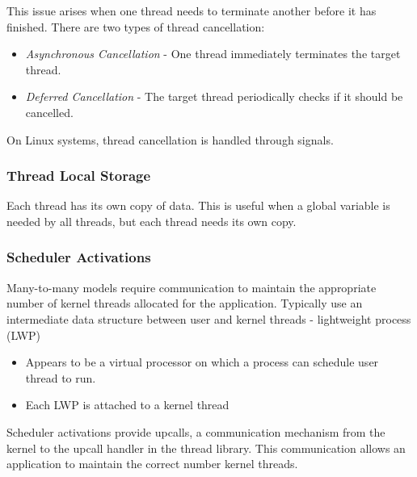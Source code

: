 \documentclass[]{article}
\begin{document}
This issue arises when one thread needs to terminate another before it has finished. There are two types of thread cancellation:

\begin{itemize}
    \item \emph{Asynchronous Cancellation} - One thread immediately terminates the target thread.
    \item \emph{Deferred Cancellation} - The target thread periodically checks if it should be cancelled.
\end{itemize}

On Linux systems, thread cancellation is handled through signals.

\subsubsection*{Thread Local Storage}

Each thread has its own copy of data. This is useful when a global variable is needed by all threads, but each thread needs its own copy.

\subsubsection*{Scheduler Activations}

Many-to-many models require communication to maintain the appropriate number of kernel threads allocated for the application. Typically use an intermediate data structure between user and kernel threads - lightweight process (LWP)

\begin{itemize}
    \item Appears to be a virtual processor on which a process can schedule user thread to run.
    \item Each LWP is attached to a kernel thread
\end{itemize}

Scheduler activations provide upcalls, a communication mechanism from the kernel to the upcall handler in the thread library. This communication allows an application to maintain the correct number kernel threads.
\end{document}
